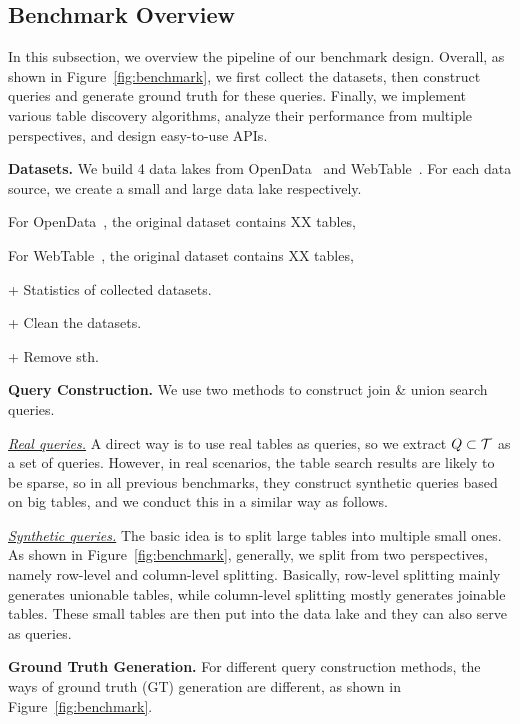\subsection{Benchmark Overview}
In this subsection, we overview the pipeline of our benchmark design. Overall, as shown in Figure~\ref{fig:benchmark}, we first collect the datasets, then construct queries and generate ground truth for these queries. Finally, we implement various table discovery algorithms, analyze their performance from multiple perspectives, and design easy-to-use APIs.

\noindent\textbf{Datasets.}
We build 4 data lakes from OpenData~\cite{OpenData} and WebTable~\cite{WebTable}. For each data source, we create a small and large data lake respectively.

For OpenData~\cite{OpenData}, the original dataset contains XX tables, 

For WebTable~\cite{WebTable}, the original dataset contains XX tables, 


+ Statistics of collected datasets.

+ Clean the datasets.

+ Remove sth.



\noindent\textbf{Query Construction.} We use two methods to construct join \& union search queries.

\noindent \underline{\textit{Real queries.}}  A direct way  is to use real tables  as queries, so we  extract  $Q\subset \mathcal{T}$ as a set of queries. However, in real scenarios, the table search results are likely to be sparse, so in all previous benchmarks, they construct synthetic queries based on big tables, and we conduct this in a similar way as follows.

\noindent \underline{\textit{Synthetic queries.}} The basic idea is to split large tables into multiple small ones. As shown in Figure~\ref{fig:benchmark}, generally, we split from two perspectives, namely row-level and column-level splitting. 
Basically, row-level splitting mainly generates unionable tables, while column-level splitting mostly generates joinable tables.
These small tables are then put into the data lake and they can also serve as queries.


\noindent\textbf{Ground Truth Generation.} For different query construction methods, the ways of ground truth (GT) generation are different, as shown in Figure~\ref{fig:benchmark}.

